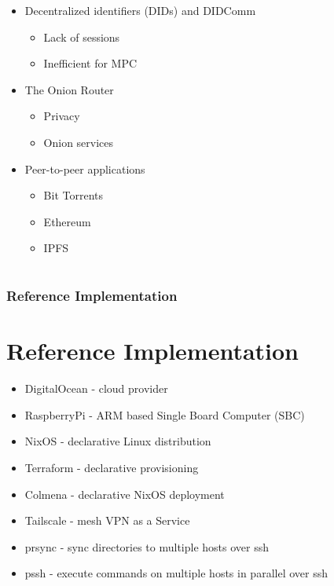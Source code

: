 \begin{itemize}
\tightlist
\item
  Decentralized identifiers (DIDs) and DIDComm

  \begin{itemize}
  \tightlist
  \item
    Lack of sessions
  \item
    Inefficient for MPC
  \end{itemize}
\item
  The Onion Router

  \begin{itemize}
  \tightlist
  \item
    Privacy
  \item
    Onion services
  \end{itemize}
\item
  Peer-to-peer applications

  \begin{itemize}
  \tightlist
  \item
    Bit Torrents
  \item
    Ethereum
  \item
    IPFS
  \end{itemize}
\end{itemize}

\hypertarget{section}{%
\part{}\label{section}}

\section{Reference Implementation}

\hypertarget{reference-implementation}{%
\part{Reference Implementation}\label{reference-implementation}}

\begin{itemize}
\tightlist
\item
  DigitalOcean - cloud provider
\item
  RaspberryPi - ARM based Single Board Computer (SBC)
\item
  NixOS - declarative Linux distribution
\item
  Terraform - declarative provisioning
\item
  Colmena - declarative NixOS deployment
\item
  Tailscale - mesh VPN as a Service
\item
  prsync - sync directories to multiple hosts over ssh
\item
  pssh - execute commands on multiple hosts in parallel over ssh
\end{itemize}

